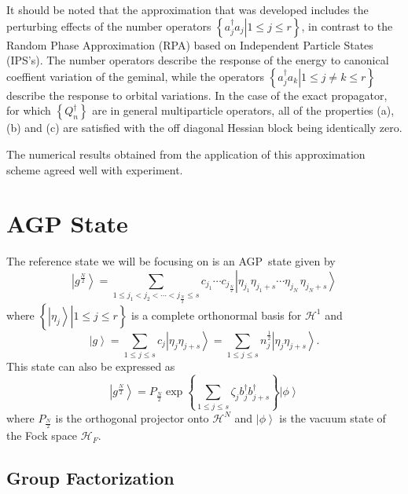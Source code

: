 \documentclass[aps,preprint]{revtex4}%
\begin{document}
It should be noted that the approximation that was developed includes the
perturbing effects of the number operators $\left\{  \left.  a_{j}^{\dagger
}a_{j}\right\vert 1\leq j\leq r\right\}  $, in contrast to the Random Phase
Approximation (RPA) based on Independent Particle States (IPS's). The number
operators describe the response of the energy to canonical coeffient variation
of the geminal, while the operators $\left\{  \left.  a_{j}^{\dagger}%
a_{k}\right\vert 1\leq j\neq k\leq r\right\}  $ describe the response to
orbital variations. In the case of the exact propagator, for which $\left\{
Q_{n}^{\dagger}\right\}  $ are in general multiparticle operators, all of the
properties (a), (b) and (c) are satisfied with the off diagonal Hessian block
being identically zero.

The numerical results obtained from the application of this approximation
scheme agreed well with experiment. 

\section{AGP State}

The reference state we will be focusing on is an AGP\ state given by
\begin{equation}
\left\vert g^{\frac{N}{2}}\right\rangle =\sum_{1\leq j_{1}<j_{2}%
<\cdots<j_{\frac{N}{2}}\leq s}c_{j_{1}}\cdots c_{j_{\frac{N}{2}}}\left\vert
\eta_{j_{1}}\eta_{j_{1}+s}\cdots\eta_{j_{N}\,}\eta_{j_{N}+s}\right\rangle
\label{canexp}%
\end{equation}
where $\left\{  \left.  \left\vert \eta_{j}\right\rangle \right\vert 1\leq
j\leq r\right\}  $ is a complete orthonormal basis for $\mathcal{H}^{1}$ and
\begin{equation}
\left\vert g\right\rangle =\sum_{1\leq j\leq s}c_{j}\left\vert \eta_{j}%
\eta_{j+s}\right\rangle =\sum_{1\leq j\leq s}n_{j}^{\frac{1}{2}}\left\vert
\eta_{j}\eta_{j+s}\right\rangle .
\end{equation}
This state can also be expressed as
\begin{equation}
\left\vert g^{\frac{N}{2}}\right\rangle =P_{\frac{N}{2}}\exp\left\{
\sum_{1\leq j\leq s}\zeta_{j}b_{j}^{\dagger}b_{j+s}^{\dagger}\right\}
\left\vert \phi\right\rangle
\end{equation}
where $P_{\frac{N}{2}}$ is the orthogonal projector onto $\mathcal{H}^{N}$ and
$\left\vert \phi\right\rangle $ is the vacuum state of the Fock space
$\mathcal{H}_{F}$.

\subsection{Group Factorization\label{factor}}
\end{document}
